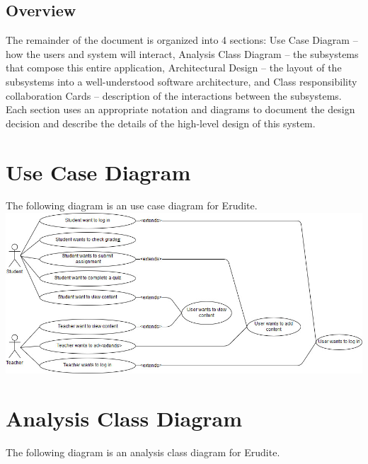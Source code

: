 \documentclass[]{article}
\begin{document}
\subsection{Overview}
\label{sub:overview}
The remainder of the document is organized into 4 sections: Use Case Diagram --
how the users and system will interact, Analysis Class Diagram -- the
subsystems that compose this entire application, Architectural Design -- the
layout of the subsystems into a well-understood software architecture, and
Class responsibility collaboration Cards -- description of the interactions
between the subsystems. Each section uses an appropriate notation and diagrams
to document the design decision and describe the details of the high-level
design of this system.




\newpage

\section{Use Case Diagram}
\label{sec:use_case_diagram}
The following diagram is an use case diagram for Erudite.\\

{
  \centering
  \includegraphics[scale=0.40]{A2_Assets/Use_Case_Diagram_v1.jpg}
}

\newpage

\section{Analysis Class Diagram}
\label{sec:analysis_class_diagram}
The following diagram is an analysis class diagram for Erudite.\\
\end{document}
